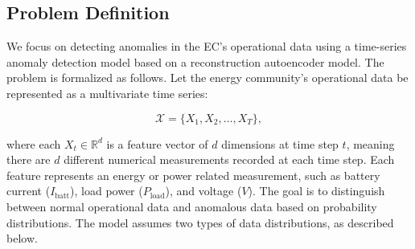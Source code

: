 \subsection{Problem Definition}

We focus on detecting anomalies in the EC’s operational data using a time-series anomaly detection model based on a reconstruction autoencoder model. The problem is formalized as follows. Let the energy community's operational data be represented as a multivariate time series:

\begin{equation}
\mathcal{X} = \{X_1, X_2, \dots, X_T\},
\end{equation}

where each $X_t \in \mathbb{R}^d$ is a feature vector of $d$ dimensions at time step $t$, meaning there are $d$ different numerical measurements recorded at each time step. Each feature represents an energy or power related measurement, such as battery current ($I_{\text{batt}}$), load power ($P_{\text{load}}$), and voltage ($V$). The goal is to distinguish between normal operational data and anomalous data based on probability distributions. The model assumes two types of data distributions, as described below.

